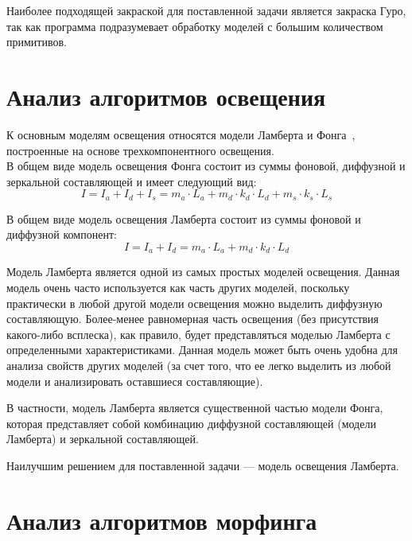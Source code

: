 Наиболее подходящей закраской для поставленной задачи является закраска Гуро, так как программа подразумевает обработку моделей с большим количеством примитивов.

\newpage

\section{Анализ алгоритмов освещения}

К основным моделям освещения относятся модели Ламберта и Фонга~\cite{Zadorozhnyi}, построенные на основе трехкомпонентного освещения.\\

В общем виде модель освещения Фонга состоит из суммы фоновой, диффузной и зеркальной составляющей и имеет следующий вид:
\begin{equation}
	I = I_{a} + I_{d} + I_{s} = m_{a} \cdot L_{a} + m_{d} \cdot k_{d} \cdot L_{d} + m_{s} \cdot k_{s} \cdot L_{s}
\end{equation}

\leavevmode

В общем виде модель освещения Ламберта состоит из суммы фоновой и диффузной компонент:
\begin{equation}
	I = I_{a} + I_{d} = m_{a} \cdot L_{a} + m_{d} \cdot k_{d} \cdot L_{d}
\end{equation}

Модель Ламберта является одной из самых простых моделей освещения. Данная модель очень часто используется как часть других моделей, поскольку практически в любой другой модели освещения можно выделить диффузную составляющую. Более-менее равномерная часть освещения (без присутствия какого-либо всплеска), как правило, будет представляться моделью Ламберта с определенными характеристиками. Данная модель может быть очень удобна для анализа свойств других моделей (за счет того, что ее легко выделить из любой модели и анализировать оставшиеся составляющие).

В частности, модель Ламберта является существенной частью модели Фонга, которая представляет собой комбинацию диффузной составляющей (модели Ламберта) и зеркальной составляющей.~\cite{Zadorozhnyi}

\leavevmode

Наилучшим решением для поставленной задачи --- модель освещения Ламберта.

\newpage

\section{Анализ алгоритмов морфинга}

